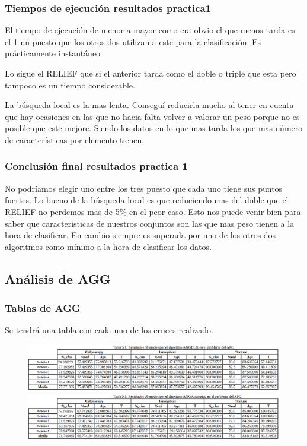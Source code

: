 \documentclass[titlepage]{article}
\begin{document}
	\subsubsection{Tiempos de ejecución resultados practica1 }
		El tiempo de ejecución de menor a mayor como era obvio el que menos tarda es el 1-nn puesto que los otros dos utilizan a este para la clasificación. Es prácticamente instantáneo
	
	Lo sigue el RELIEF que si el anterior tarda como el doble o triple que esta pero tampoco es un tiempo considerable.
	
	La búsqueda local es la mas lenta. Conseguí reducirla mucho al tener en cuenta que hay ocasiones en las que no hacia falta volver a valorar un peso porque no es posible que este mejore. Siendo los datos en lo que mas tarda los que mas número de características por elemento tienen.
	
	
	\subsubsection{Conclusión final resultados practica 1}
	No podríamos elegir uno entre los tres puesto que cada uno tiene sus puntos fuertes. Lo bueno de la búsqueda local es que reduciendo mas del doble que el RELIEF no perdemos mas de 5\% en el peor caso. Esto nos puede venir bien para saber que características de nuestros conjuntos son las que mas peso tienen a la hora de clasificar. En cambio siempre es superada por uno de los otros dos algoritmos como mínimo a la hora de clasificar los datos.

	\subsection{Análisis de AGG}
	\subsubsection{Tablas de AGG}
	Se tendrá una tabla con cada uno de los cruces realizado.
	\begin{figure}[H]
		\centering
		\includegraphics[width=1\linewidth]{screenshot005}
		\caption{}
		\label{fig:screenshot005}
	\end{figure}
	
\end{document}
